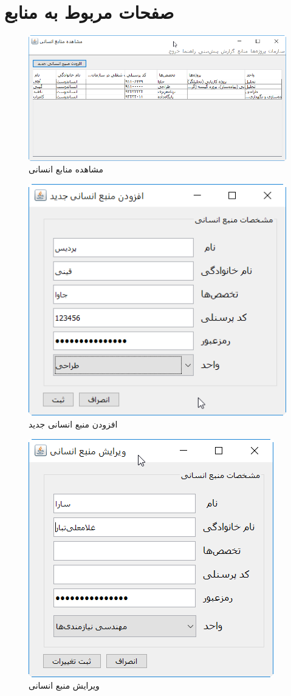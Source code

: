 \section{صفحات مربوط به منابع}
\begin{figure}[H]
	\centering
	\includegraphics[scale=0.8]{img/prot/ViewHumanResources}
	\caption{مشاهده منابع انسانی}
\end{figure}
\begin{figure}[H]
	\centering
	\includegraphics[scale=0.8]{img/prot/AddNewHumanResource}
	\caption{افزودن منبع انسانی جدید}
\end{figure}
\begin{figure}[H]
	\centering
	\includegraphics[scale=0.8]{img/prot/EditHumanResource}
	\caption{ویرایش منبع انسانی }
\end{figure}
